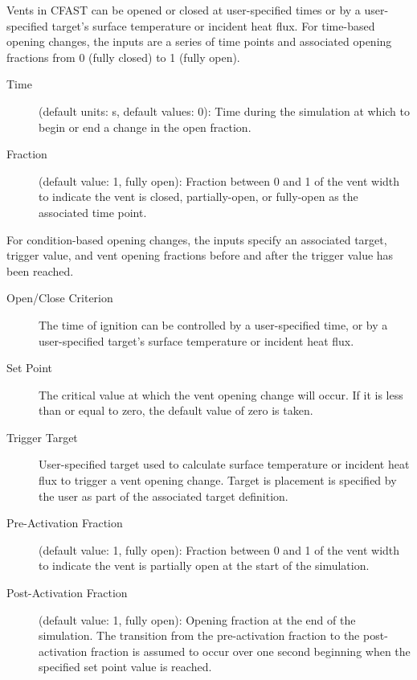 Vents in CFAST can be opened or closed at user-specified times or by a user-specified target's surface temperature or incident heat flux. For time-based opening changes, the inputs are a series of time points and associated opening fractions from 0 (fully closed) to 1 (fully open).

\begin{description}
\item[Time] (default units: s, default values: 0): Time during the simulation at which to begin or end a change in the open fraction.
\item[Fraction] (default value: 1, fully open): Fraction between 0 and 1 of the vent width to indicate the vent is closed, partially-open, or fully-open as the associated time point.
\end{description}


For condition-based opening changes, the inputs specify an associated target, trigger value, and vent opening fractions before and after the trigger value has been reached.

\begin{description}
\item[Open/Close Criterion] The time of ignition can be controlled by a user-specified time, or by a user-specified target's surface temperature or incident heat flux.
\item[Set Point] The critical value at which the vent opening change will occur. If it is less than or equal to zero, the default value of zero is taken.
\item[Trigger Target] User-specified target used to calculate surface temperature or incident heat flux to trigger a vent opening change. Target is placement is specified by the user as part of the associated target definition.
\item[Pre-Activation Fraction] (default value: 1, fully open): Fraction between 0 and 1 of the vent width to indicate the vent is partially open at the start of the simulation.
\item[Post-Activation Fraction] (default value: 1, fully open): Opening fraction at the end of the simulation. The transition from the pre-activation fraction to the post-activation fraction is assumed to occur over one second beginning when the specified set point value is reached.
\end{description}




